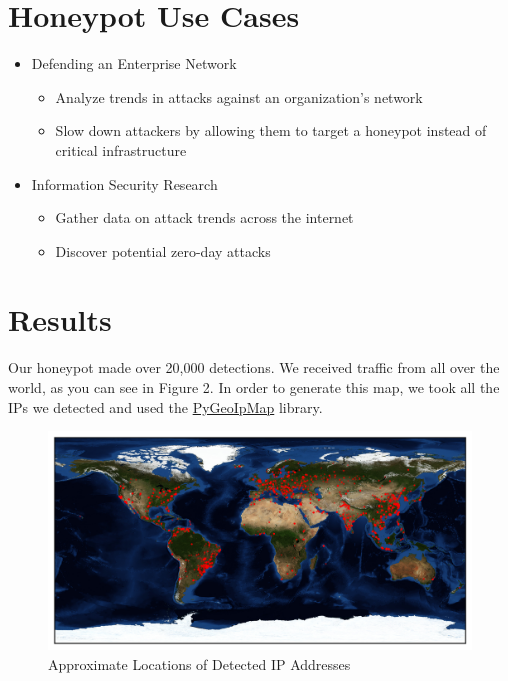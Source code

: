 \documentclass[a0,landscape]{a0poster}
\begin{document}
\begin{multicols}{3}
\section*{Honeypot Use Cases}
\begin{itemize}
	\item Defending an Enterprise Network
	\begin{itemize}
		\item Analyze trends in attacks against an organization's network
		\item Slow down attackers by allowing them to target a honeypot instead of critical infrastructure
	\end{itemize}
	\item Information Security Research
	\begin{itemize}
		\item Gather data on attack trends across the internet
		\item Discover potential zero-day attacks
	\end{itemize}
\end{itemize}


\section*{Results}
Our honeypot made over 20,000 detections. We received traffic from all over the world, as you can see in Figure 2. In order to generate this map, we took all the IPs we detected and used the \href{https://github.com/pieqq/PyGeoIpMap}{PyGeoIpMap} library.
\begin{figure}[H]
	\begin{center}
		\includegraphics[width=30cm]{map.png}
		\caption{Approximate Locations of Detected IP Addresses}
	\end{center}
\end{figure} 


\end{multicols}
\end{document}
